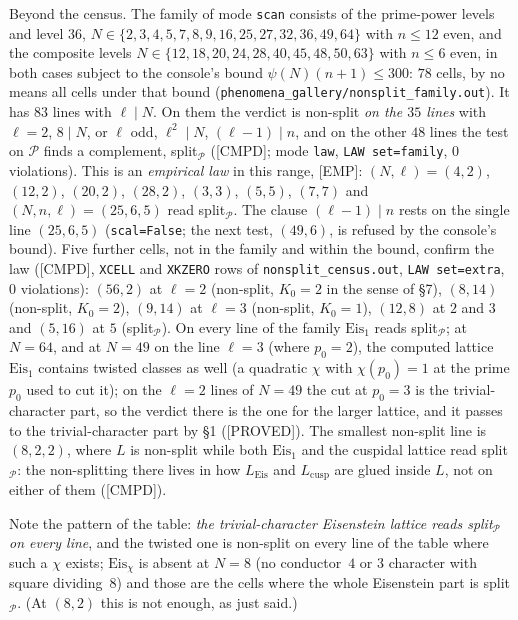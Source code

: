 \documentclass[11pt]{article}
\newcommand{\code}[1]{\texttt{#1}}
\newcommand{\file}[1]{\texttt{#1}}
\newcommand{\PROVED}{\textsf{\small[PROVED]}}
\newcommand{\CMPD}{\textsf{\small[CMPD]}}
\newcommand{\EMP}{\textsf{\small[EMP]}}
\begin{document}
Beyond the census. The family of mode \code{scan} consists of the prime-power levels and level $36$, $N\in\{2,3,4,5,7,8,9,16,25,27,32,36,49,64\}$ with $n\le12$ even, and the composite levels $N\in\{12,18,20,24,28,40,45,48,50,63\}$ with $n\le6$ even, in both cases subject to the console's bound $\psi(N)(n+1)\le300$: $78$ cells, by no means all cells under that bound (\file{phenomena\_gallery/nonsplit\_family.out}). It has $83$ lines with $\ell\mid N$. On them the verdict is non-split \emph{on the $35$ lines} with $\ell=2$, $8\mid N$, or $\ell$ odd, $\ell^{2}\mid N$, $(\ell-1)\mid n$, and on the other $48$ lines the test on $\mathcal P$ finds a complement, split$_{\mathcal P}$ (\CMPD; mode \code{law}, \code{LAW set=family}, $0$ violations). This is an \emph{empirical law} in this range, \EMP: $(N,\ell)=(4,2)$, $(12,2)$, $(20,2)$, $(28,2)$, $(3,3)$, $(5,5)$, $(7,7)$ and $(N,n,\ell)=(25,6,5)$ read split$_{\mathcal P}$. The clause $(\ell-1)\mid n$ rests on the single line $(25,6,5)$ (\code{scal=False}; the next test, $(49,6)$, is refused by the console's bound). Five further cells, not in the family and within the bound, confirm the law (\CMPD, \code{XCELL} and \code{XKZERO} rows of \file{nonsplit\_census.out}, \code{LAW set=extra}, $0$ violations): $(56,2)$ at $\ell=2$ (non-split, $K_0=2$ in the sense of \S7), $(8,14)$ (non-split, $K_0=2$), $(9,14)$ at $\ell=3$ (non-split, $K_0=1$), $(12,8)$ at $2$ and $3$ and $(5,16)$ at $5$ (split$_{\mathcal P}$). On every line of the family $\mathrm{Eis}_1$ reads split$_{\mathcal P}$; at $N=64$, and at $N=49$ on the line $\ell=3$ (where $p_0=2$), the computed lattice $\mathrm{Eis}_1$ contains twisted classes as well (a quadratic $\chi$ with $\chi(p_0)=1$ at the prime $p_0$ used to cut it); on the $\ell=2$ lines of $N=49$ the cut at $p_0=3$ is the trivial-character part, so the verdict there is the one for the larger lattice, and it passes to the trivial-character part by \S1 (\PROVED). The smallest non-split line is $(8,2,2)$, where $L$ is non-split while both $\mathrm{Eis}_1$ and the cuspidal lattice read split$_{\mathcal P}$: the non-splitting there lives in how $L_{\mathrm{Eis}}$ and $L_{\mathrm{cusp}}$ are glued inside $L$, not on either of them (\CMPD).

Note the pattern of the table: \emph{the trivial-character Eisenstein lattice reads split$_{\mathcal P}$ on every line}, and the twisted one is non-split on every line of the table where such a $\chi$ exists; $\mathrm{Eis}_\chi$ is absent at $N=8$ (no conductor~$4$ or $3$ character with square dividing~$8$) and those are the cells where the whole Eisenstein part is split$_{\mathcal P}$. (At $(8,2)$ this is not enough, as just said.)
\end{document}
